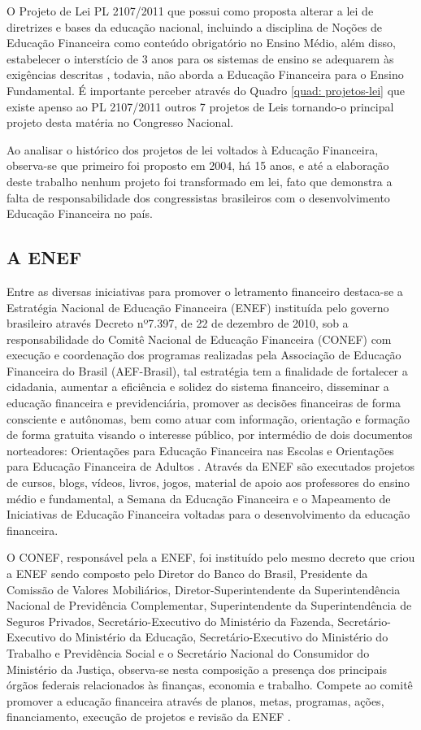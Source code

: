 O Projeto de Lei PL 2107/2011 que possui como proposta alterar a lei de diretrizes e bases da educação nacional, incluindo a disciplina de Noções de Educação Financeira como conteúdo obrigatório no Ensino Médio, além disso, estabelecer o interstício de 3 anos para os sistemas de ensino se adequarem às exigências descritas \cite{projeto2107}, todavia, não aborda a Educação Financeira para o Ensino Fundamental. É importante perceber através do Quadro \ref{quad: projetos-lei} que existe apenso ao PL 2107/2011 outros 7 projetos de Leis tornando-o principal projeto desta matéria no Congresso Nacional.

Ao analisar o histórico dos projetos de lei voltados à Educação Financeira, observa-se que primeiro foi proposto em 2004, há 15 anos, e até a elaboração deste trabalho nenhum projeto foi transformado em lei, fato que demonstra a falta de responsabilidade dos congressistas brasileiros com o desenvolvimento Educação Financeira no país.

\subsection{A ENEF}
Entre as diversas iniciativas para promover o letramento financeiro destaca-se a Estratégia Nacional de Educação Financeira (ENEF) instituída pelo governo brasileiro através Decreto nº7.397, de 22 de dezembro de 2010, sob a responsabilidade do Comitê Nacional de Educação Financeira (CONEF) com execução e coordenação dos programas realizadas pela Associação de Educação Financeira do Brasil (AEF-Brasil), tal estratégia tem a finalidade de fortalecer a cidadania, aumentar a eficiência e solidez do sistema financeiro, disseminar a educação financeira e previdenciária, promover as decisões financeiras de forma consciente e autônomas, bem como atuar com informação, orientação e formação de forma gratuita visando o interesse público, por intermédio de dois documentos norteadores: Orientações para Educação Financeira nas Escolas e Orientações para Educação Financeira de Adultos \cite{enef2010}. Através da ENEF são executados projetos de cursos, blogs, vídeos, livros, jogos, material de apoio aos professores do ensino médio e fundamental, a Semana da Educação Financeira e o Mapeamento de Iniciativas de Educação Financeira voltadas para o desenvolvimento da educação financeira.

O CONEF, responsável pela a ENEF, foi instituído pelo mesmo decreto que criou a ENEF sendo composto pelo Diretor do Banco do Brasil, Presidente da Comissão de Valores Mobiliários, Diretor-Superintendente da Superintendência Nacional de Previdência Complementar, Superintendente da Superintendência de Seguros Privados, Secretário-Executivo do Ministério da Fazenda, Secretário-Executivo do Ministério da Educação, Secretário-Executivo do Ministério do Trabalho e Previdência Social e o Secretário Nacional do Consumidor do Ministério da Justiça, observa-se nesta composição a presença dos principais órgãos federais relacionados às finanças, economia e trabalho. Compete ao comitê promover a educação financeira através de planos, metas, programas, ações, financiamento, execução de projetos e revisão da ENEF \cite{conef2010}.

